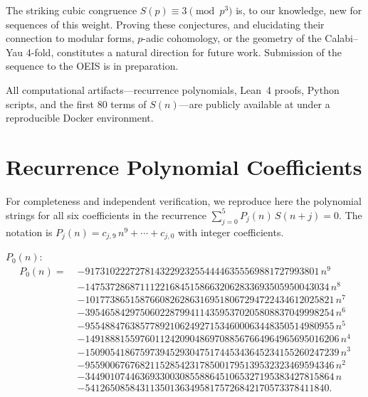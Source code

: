 \documentclass[11pt, a4paper]{article}
\begin{document}
The striking cubic congruence $S(p)\equiv 3\pmod{p^3}$ is, to our
knowledge, new for sequences of this weight.  Proving these conjectures,
and elucidating their connection to modular forms, $p$-adic cohomology, or
the geometry of the Calabi--Yau 4-fold, constitutes a natural direction for
future work.  Submission of the sequence to the OEIS is in preparation.

All computational artifacts---recurrence polynomials, Lean~4 proofs,
Python scripts, and the first 80 terms of $S(n)$---are publicly available
at \cite{repo} under a reproducible Docker environment.


\appendix
\section{Recurrence Polynomial Coefficients}\label{app:recurrence}

For completeness and independent verification, we reproduce here the
polynomial strings for all six coefficients in the recurrence
$\sum_{j=0}^5 P_j(n)\,S(n+j)=0$.  The notation is
$P_j(n)=c_{j,9}\,n^9+\cdots+c_{j,0}$ with integer coefficients.

\medskip\noindent
\textbf{$P_0(n)$}:
\begin{align*}
  P_0(n) =\; &
    {-}91731022272781432292325544446355569881727993801\,n^9 \\
  & {-}1475372868711122168451586632062833693505950043034\,n^8 \\
  & {-}10177386515876608262863169518067294722434612025821\,n^7 \\
  & {-}39546584297506022879941143595370205808837049998254\,n^6 \\
  & {-}95548847638577892106249271534600063448350514980955\,n^5 \\
  & {-}149188815597601124209048697088567664964965695016206\,n^4 \\
  & {-}150905418675973945293047517445343645234155260247239\,n^3 \\
  & {-}95590067676821152854231785001795139532323469594346\,n^2 \\
  & {-}34490107446369330030855886451065327195383427815864\,n \\
  & {-}5412650858431135013634958175726842170573378411840.
\end{align*}
\end{document}
